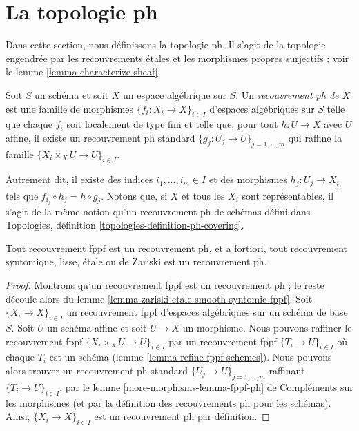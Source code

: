 \section{La topologie ph}
\label{section-ph}

\noindent
Dans cette section, nous définissons la topologie ph. Il s'agit de la topologie
engendrée par les recouvrements \'etales et les morphismes propres surjectifs ; voir
le lemme \ref{lemma-characterize-sheaf}.

\begin{definition}
\label{definition-ph-covering}
Soit $S$ un schéma et soit $X$ un espace algébrique sur $S$.
Un {\it recouvrement ph de $X$} est une famille
de morphismes $\{f_i : X_i \to X\}_{i \in I}$ d'espaces algébriques sur $S$
telle que chaque $f_i$ soit localement de type fini et telle que, pour tout
$h : U \to X$ avec $U$ affine, il existe un recouvrement ph standard
$\{g_j : U_j \to U\}_{j = 1, \ldots, m}$ qui raffine la famille
$\{X_i \times_X U \to U\}_{i \in I}$.
\end{definition}

\noindent
Autrement dit, il existe des indices $i_1, \ldots, i_m \in I$ et des
morphismes $h_j : U_j \to X_{i_j}$ tels que
$f_{i_j} \circ h_j = h \circ g_j$. Notons que, si $X$ et tous les $X_i$ sont
représentables, il s'agit de la même notion qu'un recouvrement ph de schémas défini dans
Topologies, définition \ref{topologies-definition-ph-covering}.

\begin{lemma}
\label{lemma-zariski-etale-smooth-syntomic-fppf-ph}
Tout recouvrement fppf est un recouvrement ph, et a fortiori,
tout recouvrement syntomique, lisse, \'etale ou de Zariski est un recouvrement ph.
\end{lemma}

\begin{proof}
Montrons qu'un recouvrement fppf est un recouvrement ph ; le
reste découle alors du lemme \ref{lemma-zariski-etale-smooth-syntomic-fppf}.
Soit $\{X_i \to X\}_{i \in I}$ un recouvrement fppf d'espaces algébriques
sur un schéma de base $S$. Soit $U$ un schéma affine et soit
$U \to X$ un morphisme. Nous pouvons raffiner le recouvrement fppf
$\{X_i \times_X U \to U\}_{i \in I}$ par un recouvrement fppf
$\{T_i \to U\}_{i \in I}$ où chaque $T_i$ est un schéma
(lemme \ref{lemma-refine-fppf-schemes}).
Nous pouvons alors trouver un recouvrement ph standard $\{U_j \to U\}_{j = 1, \ldots, m}$
raffinant $\{T_i \to U\}_{i \in I}$, par le
lemme \ref{more-morphisms-lemma-fppf-ph} de Compléments sur les morphismes
(et par la définition des recouvrements ph pour les schémas).
Ainsi, $\{X_i \to X\}_{i \in I}$ est un recouvrement ph par définition.
\end{proof}

